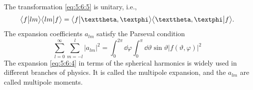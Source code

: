 The transformation \eqref{eq:5:6:5} is unitary, i.e.,
\begin{equation}
\braket{f}{lm}\braket{lm}{f}=\braket{f}{\vartheta, \varphi}\braket{\vartheta, \varphi}{f} . \label{eq:5:6:7}
\end{equation}
The expansion coefficients $a_{l m}$ satisfy the Parseval condition
\begin{equation}
\sum_{l=0}^{\infty} \sum_{m=-l}^{l}\left|a_{l m}\right|^{2}=\int_{0}^{2 \pi} \dd \varphi \int_{0}^{\pi} \dd \vartheta \sin \vartheta|f(\vartheta, \varphi)|^{2} \label{eq:5:6:8}
\end{equation}
The expansion \eqref{eq:5:6:4} in terms of the spherical harmonics is widely used in different branches of physics. It is called the multipole expansion, and the $a_{l m}$ are called multipole moments.

